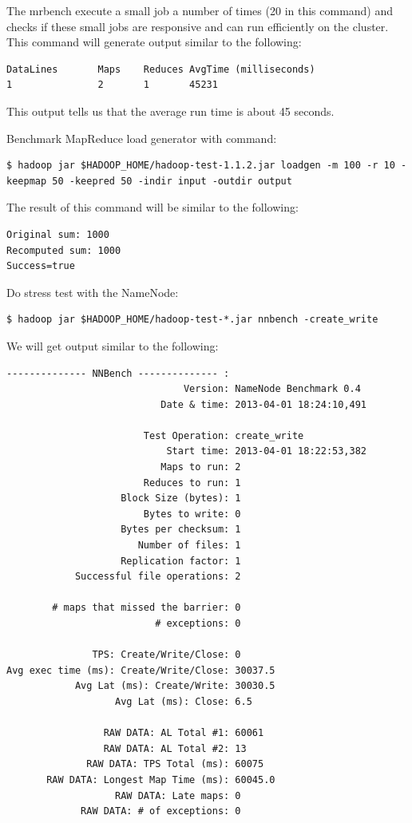 The mrbench execute a small job a number of times (20 in this command) and checks if these small jobs are responsive and can run efficiently on the cluster. This command will generate output similar to the following:
\lstset{style=bashstyle}
\begin{lstlisting}
DataLines       Maps    Reduces AvgTime (milliseconds)
1               2       1       45231
\end{lstlisting}
This output tells us that the average run time is about 45 seconds.

Benchmark MapReduce load generator with command:
\lstset{style=bashstyle}
\begin{lstlisting}
$ hadoop jar $HADOOP_HOME/hadoop-test-1.1.2.jar loadgen -m 100 -r 10 -keepmap 50 -keepred 50 -indir input -outdir output
\end{lstlisting}

The result of this command will be similar to the following:
\begin{verbatim}
Original sum: 1000
Recomputed sum: 1000
Success=true
\end{verbatim}

Do stress test with the NameNode:
\lstset{style=bashstyle}
\begin{lstlisting}
$ hadoop jar $HADOOP_HOME/hadoop-test-*.jar nnbench -create_write
\end{lstlisting}

We will get output similar to the following:
\lstset{style=bashstyle}
\begin{lstlisting}
-------------- NNBench -------------- :
                               Version: NameNode Benchmark 0.4
                           Date & time: 2013-04-01 18:24:10,491

                        Test Operation: create_write
                            Start time: 2013-04-01 18:22:53,382
                           Maps to run: 2
                        Reduces to run: 1
                    Block Size (bytes): 1
                        Bytes to write: 0
                    Bytes per checksum: 1
                       Number of files: 1
                    Replication factor: 1
            Successful file operations: 2

        # maps that missed the barrier: 0
                          # exceptions: 0

               TPS: Create/Write/Close: 0
Avg exec time (ms): Create/Write/Close: 30037.5
            Avg Lat (ms): Create/Write: 30030.5
                   Avg Lat (ms): Close: 6.5

                 RAW DATA: AL Total #1: 60061
                 RAW DATA: AL Total #2: 13
              RAW DATA: TPS Total (ms): 60075
       RAW DATA: Longest Map Time (ms): 60045.0
                   RAW DATA: Late maps: 0
             RAW DATA: # of exceptions: 0
\end{lstlisting}

